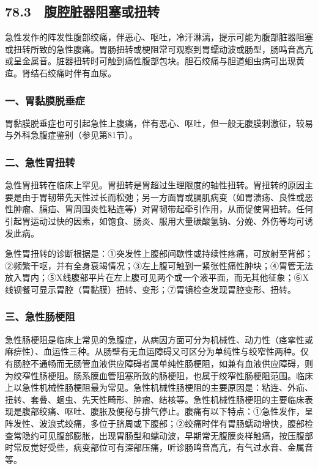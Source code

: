 \protect\hypertarget{text00196.html}{}{}

\subsection{78.3　腹腔脏器阻塞或扭转}

急性发作的阵发性腹部绞痛，伴恶心、呕吐，冷汗淋漓，提示可能为腹部脏器阻塞或扭转所致的急性腹痛。胃肠扭转或梗阻常可观察到胃蠕动波或肠型，肠鸣音高亢或呈金属音。脏器扭转时可触到痛性腹部包块。胆石绞痛与胆道蛔虫病可出现黄疸。肾结石绞痛时伴有血尿。

\subsubsection{一、胃黏膜脱垂症}

胃黏膜脱垂症也可引起急性上腹痛，伴有恶心、呕吐，但一般无腹膜刺激征，较易与外科急腹症鉴别（参见第81节）。

\subsubsection{二、急性胃扭转}

急性胃扭转在临床上罕见。胃扭转是胃超过生理限度的轴性扭转。胃扭转的原因主要是由于胃韧带先天性过长而松弛；另一方面胃或膈肌病变（如胃溃疡、良性或恶性肿瘤、膈疝、胃周围炎性粘连等）对胃韧带起牵引作用，从而促使胃扭转。任何引起胃运动过快的因素，如饱食、肠炎、服用大量碳酸氢钠、分娩、外伤等均可诱发此病。

急性胃扭转的诊断根据是：①突发性上腹部间歇性或持续性疼痛，可放射至背部；②频繁干呕，并有全身衰竭情况；③左上腹可触到一紧张性痛性肿块；④胃管无法放入胃内；⑤X线腹部平片在左上腹可见两个或一个液平面，而无其他征象；⑥X线钡餐可显示胃腔（胃黏膜）扭转、变形；⑦胃镜检查发现胃腔变形、扭转。

\subsubsection{三、急性肠梗阻}

急性肠梗阻是临床上常见的急腹症，从病因方面可分为机械性、动力性（痉挛性或麻痹性）、血运性三种。从肠壁有无血运障碍又可区分为单纯性与绞窄性两种。仅有肠腔不通畅而无肠管血液供应障碍者属单纯性肠梗阻，如兼有血液供应障碍，则为绞窄性肠梗阻。肠系膜血管阻塞所致的肠梗阻，也属于绞窄性肠梗阻范围。临床上以急性机械性肠梗阻最为常见。急性机械性肠梗阻的主要原因是：粘连、外疝、扭转、套叠、蛔虫、先天性畸形、肿瘤、结核等。急性机械性肠梗阻的主要临床表现是腹部绞痛、呕吐、腹胀及便秘与排气停止。腹痛有以下特点：①急性发作，呈阵发性、波浪式绞痛，多位于脐周或下腹部；②绞痛时伴有胃肠蠕动增快，腹部检查常隐约可见腹部膨胀，出现胃肠型和蠕动波，早期常无腹膜炎样触痛，按压腹部时常反觉好受些，病变部位可有深部压痛，听诊肠鸣音高亢，有气过水音、金属音等。

